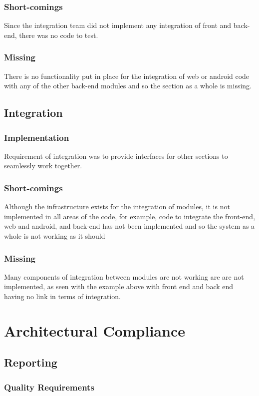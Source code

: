 \documentclass{article}
\begin{document}
        \subsubsection{Short-comings}
        Since the integration team did not implement any integration of front and back-end, there was no code to test.
        \subsubsection{Missing}
        There is no functionality put in place for the integration of web or android code with any of the other back-end modules and so the section as a whole is missing.

    \subsection{Integration}
        \subsubsection{Implementation}
        Requirement of integration was to provide interfaces for other sections to seamlessly work together.
        \subsubsection{Short-comings}
        Although the infrastructure exists for the integration of modules, it is not implemented in all areas of the code, for example, code to integrate the front-end, web and android, and back-end has not been implemented and so the system as a whole is not working as it should
        \subsubsection{Missing}
        Many components of integration between modules are not working are are not implemented, as seen with the example above with front end and back end having no link in terms of integration.

\section{Architectural Compliance}
    \subsection{Reporting}
        \subsubsection{Quality Requirements}
\end{document}
